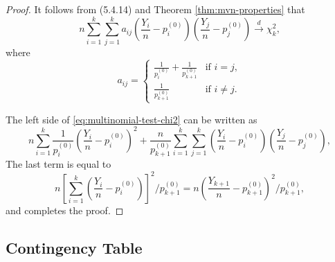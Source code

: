 \begin{proof}
	It follows from (5.4.14) and Theorem \ref{thm:mvn-properties} that
	\begin{equation}
		\label{eq:multinomial-test-chi2}
		n\sum_{i=1}^{k}\sum_{j=1}^{k}a_{ij}\left(\frac{Y_i}{n}-p_i^{(0)}\right)\left(\frac{Y_j}{n}-p_j^{(0)}\right)\stackrel{d}{\rightarrow}\chi_k^2,
	\end{equation}
	where
	\begin{equation*}
		a_{ij}=\begin{cases}
			\frac{1}{p_{i}^{(0)}}+\frac{1}{p_{k+1}^{(0)}} & \text{if }i=j,     \\
			\frac{1}{p_{k+1}^{(0)}}                       & \text{if }i\neq j.
		\end{cases}
	\end{equation*}

	The left side of \eqref{eq:multinomial-test-chi2} can be written as
	\begin{equation*}
		n\sum_{i=1}^{k}\frac{1}{p_i^{(0)}}\left(\frac{Y_i}{n}-p_i^{(0)}\right)^2+\frac{n}{p_{k+1}^{(0)}}\sum_{i=1}^{k}\sum_{j=1}^k\left(\frac{Y_i}{n}-p_i^{(0)}\right)\left(\frac{Y_j}{n}-p_j^{(0)}\right),
	\end{equation*}
	The last term is equal to
	\begin{equation*}
		n\left[\sum_{i=1}^k\left(\frac{Y_i}{n}-p_i^{(0)}\right)\right]^2/p_{k+1}^{(0)}=n\left(\frac{Y_{k+1}}{n}-p_{k+1}^{(0)}\right)^2/p_{k+1}^{(0)},
	\end{equation*}
	and completes the proof.
\end{proof}

\subsection{Contingency Table}
